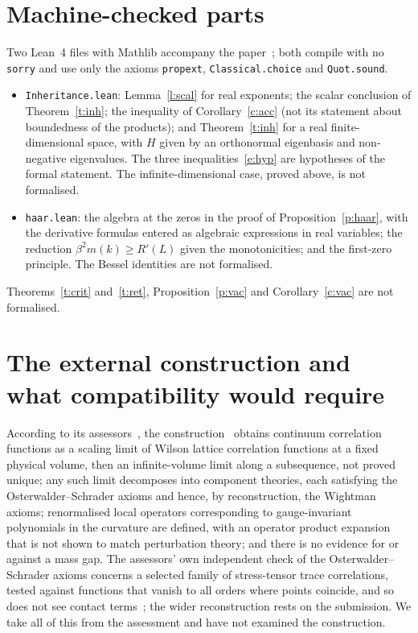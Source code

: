 \section{Machine-checked parts}\label{s:lean}
Two Lean~4 files with Mathlib accompany the paper~\cite{RepoLean}; both compile with no \texttt{sorry} and use
only the axioms \texttt{propext}, \texttt{Classical.choice} and \texttt{Quot.sound}.
\begin{itemize}
\item \texttt{Inheritance.lean}: Lemma~\ref{l:scal} for real exponents; the scalar conclusion of
Theorem~\ref{t:inh}; the inequality of Corollary~\ref{c:acc} (not its statement about boundedness of the
products); and Theorem~\ref{t:inh} for a real finite-dimensional space, with $H$ given by an orthonormal
eigenbasis and non-negative eigenvalues. The three inequalities~\eqref{e:hyp} are hypotheses of the formal
statement. The infinite-dimensional case, proved above, is not formalised.
\item \texttt{haar.lean}: the algebra at the zeros in the proof of Proposition~\ref{p:haar}, with the
derivative formulas entered as algebraic expressions in real variables; the reduction
$\beta^2m(k)\ge R'(L)$ given the monotonicities; and the first-zero principle. The Bessel identities are not
formalised.
\end{itemize}
Theorems~\ref{t:crit} and~\ref{t:ret}, Proposition~\ref{p:vac} and Corollary~\ref{c:vac} are not formalised.

\section{The external construction and what compatibility would require}\label{s:ext}
According to its assessors~\cite[pp.~1, 3]{YMG}, the construction~\cite{OAI} obtains continuum correlation
functions as a scaling limit of Wilson lattice correlation functions at a fixed physical volume, then an
infinite-volume limit along a subsequence, not proved unique; any such limit decomposes into component
theories, each satisfying the Osterwalder--Schrader axioms and hence, by reconstruction, the Wightman axioms;
renormalised local operators corresponding to gauge-invariant polynomials in the curvature are defined, with
an operator product expansion that is not shown to match perturbation theory; and there is no evidence for or
against a mass gap. The assessors' own independent check of the Osterwalder--Schrader axioms concerns a
selected family of stress-tensor trace correlations, tested against functions that vanish to all orders where
points coincide, and so does not see contact terms~\cite[Part~II]{YMG}; the wider reconstruction rests on
the submission. We take all of this from the assessment and have not examined the construction.

